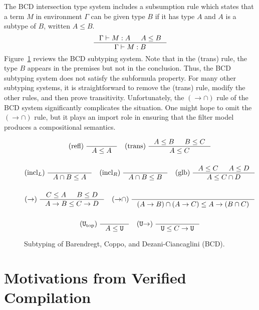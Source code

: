 \documentclass{article}
\begin{document}
The BCD intersection type system includes a subsumption rule which
states that a term $M$ in environment $\Gamma$ can be given type $B$
if it has type $A$ and $A$ is a subtype of $B$, written $A \leq B$.
\[
\inference{\Gamma \vdash M : A & A \leq B}
          {\Gamma \vdash M : B}
\]
Figure~\ref{fig:BCD-subtyping} reviews the BCD subtyping system.  Note
that in the (trans) rule, the type $B$ appears in the premises but not
in the conclusion. Thus, the BCD subtyping system does not satisfy the
subformula property.  For many other subtyping systems, it is
straightforward to remove the (trans) rule, modify the other rules,
and then prove transitivity.  Unfortunately, the $({\to}{\cap})$ rule
of the BCD system significantly complicates the situation.  One might
hope to omit the $({\to}{\cap})$ rule, but it plays an import role in
ensuring that the filter model produces a compositional semantics.

\begin{figure}[tbp]
  \begin{gather*}
    \text{(refl)} \; \inference{}{A \leq A} \quad
    \text{(trans)} \; \inference{A \leq B & B \leq C}{A \leq C} \\[3ex]
    \text{(incl$_L$)} \; \inference{}{A \cap B \leq A} \quad
    \text{(incl$_R$)} \; \inference{}{A \cap B \leq B} \quad
    \text{(glb)} \; \inference{A \leq C & A \leq D}{A \leq C \cap D} \\[3ex]
    (\to) \; \inference{C \leq A & B \leq D}{A \to B \leq C \to D} \quad
    ({\to}{\cap}) \; \inference{}{(A \to B) \cap (A \to C) \leq A \to (B \cap C)} \\[3ex]
    (\TOP_{\mathrm{top}}) \; \inference{}{A \leq \TOP} \quad
    (\TOP{\to}) \; \inference{}{\TOP \leq C \to \TOP}
  \end{gather*}
  \caption{Subtyping of Barendregt, Coppo, and
    Dezani-Ciancaglini (BCD).}
  \label{fig:BCD-subtyping}
\end{figure}

\section{Motivations from Verified Compilation}
\label{sec:motivation}
\end{document}
